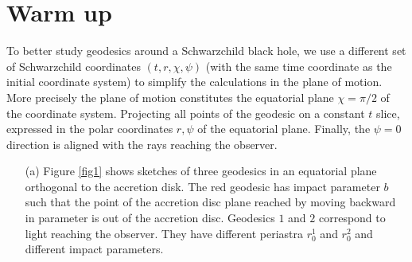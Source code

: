 \documentclass[10pt, a4paper]{article}
\begin{document}
{\section{Warm up}
To better study geodesics around a Schwarzchild black hole, we use a different set of Schwarzchild coordinates $(t, r, \chi, \psi)$ (with the same time coordinate as the initial coordinate system) to simplify the calculations in the plane of motion. More precisely the plane of motion constitutes the equatorial plane $\chi = \pi/2$ of the coordinate system. Projecting all points of the geodesic on a constant $t$ slice, expressed in the polar coordinates $r, \psi$
of the equatorial plane. Finally, the $\psi = 0$ direction is aligned with the rays reaching the observer. 

\begin{enumerate}
  \item[(a)] Figure \ref{fig1} shows sketches of three geodesics in an equatorial plane orthogonal to the accretion disk. The red geodesic has impact parameter $b$ such that the point of the accretion disc plane reached by moving backward in parameter is out of the accretion disc. Geodesics $1$ and $2$ correspond to light reaching the observer. They have different periastra $r_0^1$ and $r_0^2$ and different impact parameters.
  \begin{figure}[h!]
    \centering
\end{figure}
\end{enumerate}}
\end{document}
